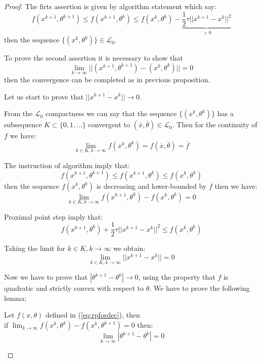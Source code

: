 \begin{proof}
The firts assertion is given by algorithm statement which say:
\begin{equation}
f(x^{k+1},\theta^{k+1})\le f(x^{k+1},\theta^k)\le f(x^k,\theta^k)- \underbrace{\frac{1}{2}\tau ||x^{k+1}-x^{k}||^2}_{>0}
\end{equation}
then the sequence $\{(x^k,\theta^k)\} \in \mathcal{L}_0$.

To prove the second assertion it is necessary to show that
\begin{equation}
\lim_{k \rightarrow \infty} ||(x^{k+1},\theta^{k+1})-(x^{k},\theta^{k})||=0
\end{equation}
then the convergence can be completed as in previous proposition.

Let us start to prove that $||x^{k+1}-x^{k}||\to0$.

From the $\mathcal{L}_0$ compactness we can say that the sequence $\{(x^k,\theta^k)\}$ has a subsequence $K \subset \{0,1,\ldots\}$ convergent to $(\overline{x},\overline{\theta}) \in \mathcal{L}_0$. Then for the continuity of $f$ we have:
\begin{equation}
\lim_{k \in K, k \rightarrow \infty}f(x^k,\theta^k)=f(\overline{x},\overline{\theta})= \overline{f}
\end{equation}

The instruction of algorithm imply that:
\begin{equation}
f(x^{k+1},\theta^{k+1})\le f(x^{k+1},\theta^{k})\le f(x^k,\theta^k)
\end{equation}
then the sequence $f(x^k,\theta^k)$ is decreasing and lower-bounded by $\overline{f}$ then we have:
\begin{equation}
\lim_{k \in K, k \rightarrow \infty} f(x^{k+1},\theta^{k})-f(x^{k},\theta^{k})=0
\end{equation}

Proximal point step imply that:
\begin{equation}
f(x^{k+1},\theta^{k})+\frac{1}{2}\tau||x^{k+1}-x^{k}||^2 \le f(x^{k},\theta^{k})
\end{equation}

Taking the limit for $k \in K, k \to \infty$ we obtain:
\begin{equation}
\lim_{k \in K,k \to \infty} ||x^{k+1}-x^{k}||=0
\end{equation}

Now we have to prove that $|\theta^{k+1}-\theta^{k}|\to 0$, using the property that $f$ is quadratic and strictly convex with respect to $\theta$. 
We have to prove the following lemma:
\begin{lemma}
Let $f(x,\theta)$ defined in (\ref{eq:rpfordec}), then\\ if $\lim_{k \to \infty} f(x^{k},\theta^k)-f(x^{k},\theta^{k+1})=0$ then:
\begin{equation}
 \lim_{k\to \infty} |\theta^{k+1} -\theta^k| = 0 
\end{equation}
\end{lemma}


\end{proof}
